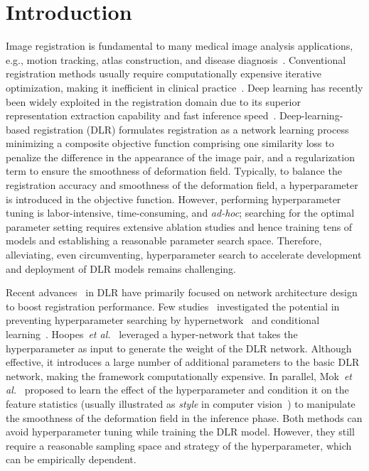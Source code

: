 \documentclass[runningheads]{llncs}
\begin{document}
\section{Introduction}
Image registration is fundamental to many medical image analysis applications, e.g., motion tracking, atlas construction, and disease diagnosis~\cite{chen2021deep}. Conventional registration methods usually require computationally expensive iterative optimization, making it inefficient in clinical practice~\cite{avants2008symmetric,vercauteren2009diffeomorphic}. Deep learning has recently been widely exploited in the registration domain due to its superior representation extraction capability and fast inference speed~\cite{balakrishnan2018unsupervised,dalca2018unsupervised}. Deep-learning-based registration (DLR) formulates registration as a network learning process minimizing a composite objective function comprising one similarity loss to penalize the difference in the appearance of the image pair, and a regularization term to ensure the smoothness of deformation field. Typically, to balance the registration accuracy and smoothness of the deformation field, a hyperparameter is introduced in the objective function. However, performing hyperparameter tuning is labor-intensive, time-consuming, and \emph{ad-hoc}; searching for the optimal parameter setting requires extensive ablation studies and hence training tens of models and establishing a reasonable parameter search space. Therefore, alleviating, even circumventing, hyperparameter search to accelerate development and deployment of DLR models remains challenging.

Recent advances~\cite{chen2021registration,huang2021difficulty,jia2021learning} in DLR have primarily focused on network architecture design to boost registration performance. 
Few studies~\cite{hoopes2021hypermorph,mok2021conditional} investigated the potential in preventing hyperparameter searching by hypernetwork~\cite{ha2016hypernetworks} and conditional learning~\cite{huang2017arbitrary}. Hoopes~\textit{et al.}~\cite{hoopes2021hypermorph} leveraged a hyper-network that takes the hyperparameter as input to generate the weight of the DLR network. Although effective, it introduces a large number of additional parameters to the basic DLR network, making the framework computationally expensive. In parallel, Mok~\textit{et al.}~\cite{mok2021conditional} proposed to learn the effect of the hyperparameter and condition it on the feature statistics (usually illustrated as \textit{style} in computer vision~\cite{huang2017arbitrary}) to manipulate the smoothness of the deformation field in the inference phase. Both methods can avoid hyperparameter tuning while training the DLR model. However, they still require a reasonable sampling space and strategy of the hyperparameter, which can be empirically dependent.
\end{document}
